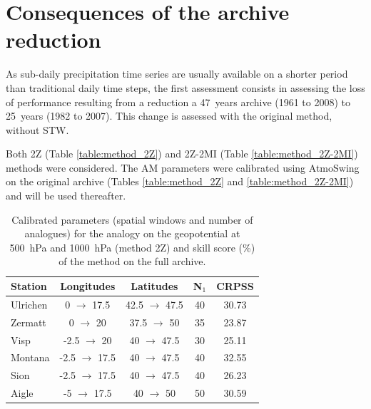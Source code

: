 \documentclass[hess]{copernicus}
\begin{document}
\section{Consequences of the archive reduction}

As sub-daily precipitation time series are usually available on a shorter period than traditional daily time steps, the first assessment consists in assessing the loss of performance resulting from a reduction a 47~years archive (1961 to 2008) to 25~years (1982 to 2007). This change is assessed with the original method, without STW.

Both 2Z (Table \ref{table:method_2Z}) and 2Z-2MI (Table \ref{table:method_2Z-2MI}) methods were considered. The AM parameters were calibrated using AtmoSwing \citep{Horton2016} on the original archive (Tables \ref{table:method_2Z} and \ref{table:method_2Z-2MI}) and will be used thereafter.

\begin{table}[htb]
	\caption{Calibrated parameters (spatial windows and number of analogues) for the analogy on the geopotential at 500~hPa and 1000~hPa (method 2Z) and skill score (\%) of the method on the full archive.}
	\begin{center}
		\begin{tabular}{l c c c c }
			\hline
			Station & Longitudes & Latitudes & N$_{1}$ & CRPSS \\
			\hline
			Ulrichen & 0 $\rightarrow$ 17.5 & 42.5 $\rightarrow$ 47.5 & 40 & 30.73 \\
			Zermatt & 0 $\rightarrow$ 20 & 37.5 $\rightarrow$ 50 & 35 & 23.87 \\
			Visp & -2.5 $\rightarrow$ 20 & 40 $\rightarrow$ 47.5 & 30 & 25.11 \\
			Montana & -2.5 $\rightarrow$ 17.5 & 40 $\rightarrow$ 47.5 & 40 & 32.55 \\
			Sion & -2.5 $\rightarrow$ 17.5 & 40 $\rightarrow$ 47.5 & 40 & 26.23 \\
			Aigle & -5 $\rightarrow$ 17.5 & 40 $\rightarrow$ 50 & 50 & 30.59 \\ 
			\hline
		\end{tabular}
	\end{center}
	\label{table:params_2Z}
\end{table}
\end{document}
